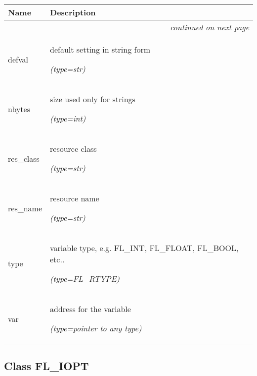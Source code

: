     \vspace{-1cm}
\hspace{\varindent}\begin{longtable}{|p{\varnamewidth}|p{\vardescrwidth}|l}
\cline{1-2}
\cline{1-2} \centering \textbf{Name} & \centering \textbf{Description}& \\
\cline{1-2}
\endhead\cline{1-2}\multicolumn{3}{r}{\small\textit{continued on next page}}\\\endfoot\cline{1-2}
\endlastfoot\raggedright d\-e\-f\-v\-a\-l\- & \raggedright default setting in string form

            {\it (type=str)}&\\
\cline{1-2}
\raggedright n\-b\-y\-t\-e\-s\- & \raggedright size used only for strings

            {\it (type=int)}&\\
\cline{1-2}
\raggedright r\-e\-s\-\_\-c\-l\-a\-s\-s\- & \raggedright resource class

            {\it (type=str)}&\\
\cline{1-2}
\raggedright r\-e\-s\-\_\-n\-a\-m\-e\- & \raggedright resource name

            {\it (type=str)}&\\
\cline{1-2}
\raggedright t\-y\-p\-e\- & \raggedright variable type, e.g. FL\_INT, FL\_FLOAT, FL\_BOOL, etc..

            {\it (type=FL\_RTYPE)}&\\
\cline{1-2}
\raggedright v\-a\-r\- & \raggedright address for the variable

            {\it (type=pointer to any type)}&\\
\cline{1-2}
\end{longtable}



\subsection{Class FL\_IOPT}

